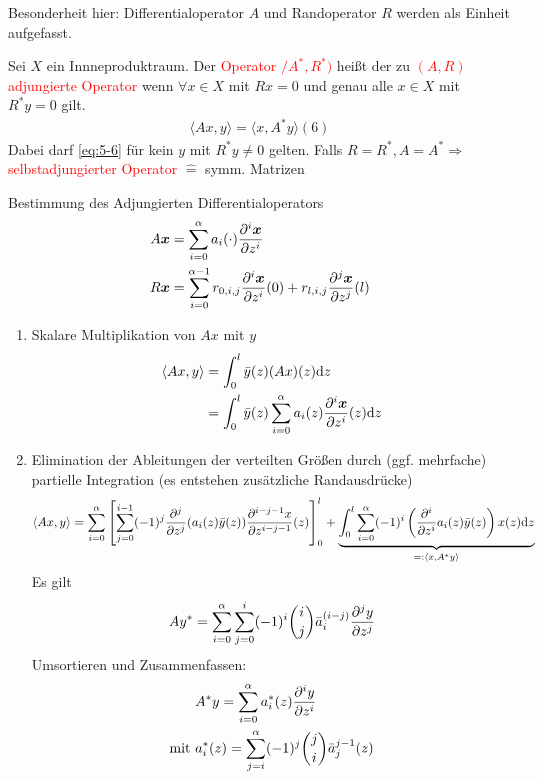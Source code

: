 Besonderheit hier: Differentialoperator $A$ und Randoperator $R$ werden als Einheit aufgefasst.
\begin{defi}Sei $X$ ein Innneproduktraum. Der \textcolor{red}{Operator $/A^*,R^*)$} heißt der zu \textcolor{red}{$(A,R)$ adjungierte Operator} wenn $\forall x \in X$ mit $Rx=0$ und genau alle $x \in X$ mit $R^*y=0$ gilt.
\begin{align}
\label{eq:5-6}
\langle Ax,y \rangle = \langle x,A^* y \rangle (6)
\end{align}
Dabei darf \eqref{eq:5-6} für kein $y$ mit $R^*y \neq 0$ gelten. Falls $R= R^*, A = A^* \Rightarrow$ \textcolor{red}{selbstadjungierter Operator} $\hat{=}$ symm. Matrizen
\end{defi}
Bestimmung des Adjungierten Differentialoperators
\begin{align*}
A\bm{x} &= \sum_{i=0}^\alpha a_i(\cdot)\pd[i]{\bm{x}}{z^i} \\
R \bm{x} &= \sum_{i=0}^{\alpha-1}r_{0,i,j} \pd[i]{\bm{x}}{z^i}(0)+r_{l,i,j} \pd[j]{\bm{x}}{z^j}(l)
\end{align*}
\begin{enumerate}
\item Skalare Multiplikation von $Ax$ mit $y$
\begin{align*}
\langle A x , y \rangle &=  \int_0^l\bar{y}(z)(Ax)(z) \d z \\
 &= \int_0^l\bar{y}(z)\sum_{i=0}^\alpha a_i(z)\pd[i]{\bm{x}}{z^i} (z) \d z
\end{align*}
\item Elimination der Ableitungen der verteilten Größen durch (ggf. mehrfache) partielle Integration (es entstehen zusätzliche Randausdrücke)
\begin{align*}
\langle A x , y \rangle = \sum_{i=0}^\alpha \left[ \sum_{j=0}^{i-1}(-1)^j \pd[j]{}{z^j}(a_i(z)\bar{y}(z))\pd[i-j-1]{x}{z^{i-j-1}}(z) \right]_0^l + \underbrace{\int_0^l \sum_{i=0}^\alpha (-1)^i \left( \pd[i]{}{z^i} a_i(z) \bar{y}(z)\right)x(z) \d z}_{=: \langle x , A^* y \rangle}
\end{align*}
Es gilt
\begin{align*}
Ay^* = \sum^\alpha_{i=0}\sum^i_{j=0}(-1)^i \binom{i}{j} \bar{a}_i^{(i-j)} \pd[j]{y}{z^j}
\end{align*}
Umsortieren und Zusammenfassen:
\begin{align*}
& A^*y = \sum^\alpha_{i=0}a_i^*(z) \pd[i]{y}{z^i} \\
\textrm{mit } & a_i^*(z) =  \sum_{j=i}^\alpha (-1)^j \binom{j}{i} \bar{a}_j^{j-1}(z)
\end{align*}
\end{enumerate}
